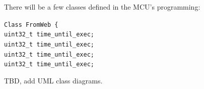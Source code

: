 \begin{flushleft}
    There will be a few classes defined in the MCU's programming:
    \begin{center}
        \texttt{Class FromWeb \{}  \\
        \texttt{uint32\_t time\_until\_exec;} \\
        \texttt{uint32\_t time\_until\_exec;} \\
        \texttt{uint32\_t time\_until\_exec;} \\
        \texttt{uint32\_t time\_until\_exec;} \\
    \end{center}


    TBD, add UML class diagrams.
\end{flushleft}
\begin{flushleft}
\end{flushleft}
\begin{flushleft}
\end{flushleft}
\begin{flushleft}
\end{flushleft}
\begin{flushleft}
\end{flushleft}
\begin{flushleft}
\end{flushleft}
\begin{flushleft}
\end{flushleft}
\begin{flushleft}
\end{flushleft}
\begin{flushleft}
\end{flushleft}